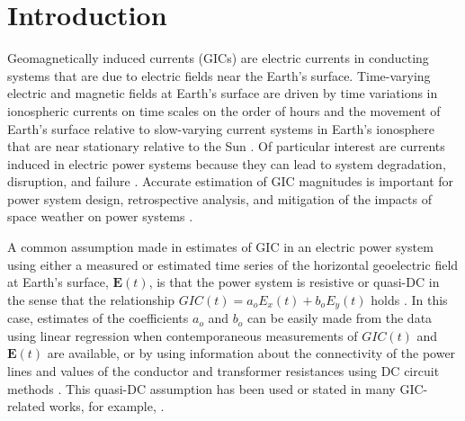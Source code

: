 \documentclass[draft,linenumbers]{agujournal2018}
\begin{document}
\section{Introduction}

Geomagnetically induced currents (GICs) are electric currents in conducting systems that are due to electric fields near the Earth's surface. Time-varying electric and magnetic fields at Earth's surface are driven by time variations in ionospheric currents on time scales on the order of hours \citep{Ohtani2000} and the movement of Earth's surface relative to slow-varying current systems in Earth's ionosphere that are near stationary relative to the Sun \citep{Stening2013}. Of particular interest are currents induced in electric power systems because they can lead to system degradation, disruption, and failure \citep{Albertson1993,NERC2012,Gaunt2014}. Accurate estimation of GIC magnitudes is important for power system design, retrospective analysis, and mitigation of the impacts of space weather on power systems \citep{Molinski2002,Thomson2010,NERC2012,Gaunt2014}. 

A common assumption made in estimates of GIC in an electric power system using either a measured or estimated time series of the horizontal geoelectric field at Earth's surface, $\mathbf{E}(t)$, is that the power system is resistive or quasi-DC in the sense that the relationship $GIC(t) = a_oE_x(t) + b_oE_y(t)$ holds \citep{Albertson1981,Lehtinen1985}. In this case, estimates of the coefficients $a_o$ and $b_o$ can be easily made from the data using linear regression when contemporaneous measurements of $GIC(t)$ and $\mathbf{E}(t)$ are available, or by using information about the connectivity of the power lines and values of the conductor and transformer resistances using DC circuit methods \citep[e.g.,][]{Boteler2014a,Boteler2014b}. This quasi-DC assumption has been used or stated in many GIC-related works, for example, \citet{Pulkkinen2007,Wik2008,Pulkkinen2010,Ngwira2011,Horton2012,Viljanen2012,Overbye2012,Marshall2013,Liu2014,Zheng2014,Watari2015,Bonner2017}. 


\end{document}

